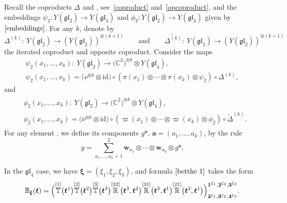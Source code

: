 \documentclass[pdftex]{sigma}
\numberwithin{equation}{section}
\begin{document}
Recall the coproducts $\Delta$ and \smash{$\widetilde{\Delta}$}, see~\eqref{coproduct} and~\eqref{opcoproduct}, and the embeddings $\psi_2\colon Y(\mathfrak{g l}_{2})\rightarrow Y(\mathfrak{g l}_{4})$ and $\phi_2\colon Y(\mathfrak{g l}_{2})\rightarrow Y(\mathfrak{g l}_{4})$ given by $\eqref{embeddings}$.
For any $k$, denote by
\[
 \Delta^{(k)}\colon \ Y(\mathfrak{g l}_{2}) \rightarrow(Y(\mathfrak{g l}_{2}))^{\otimes(k+1)} \qquad \text{and}\qquad \widetilde{\Delta^{(k)}}\colon \ Y(\mathfrak{g l}_{2}) \rightarrow(Y(\mathfrak{g l}_{2}))^{\otimes(k+1)}
 \]
 the iterated coproduct and opposite coproduct.
Consider the maps
\begin{gather*}\psi_2(x_{1}, \dots, x_{k})\colon\ Y(\mathfrak{g l}_{2}) \rightarrow\bigl(\mathbb{C}^{2}\bigr)^{\otimes k} \otimes Y(\mathfrak{g l}_{4}),
\\
\psi_2(x_{1}, \dots, x_{k})= \bigl(\nu^{\otimes k} \otimes \mathrm{id}\bigr) \circ (\pi (x_{1} ) \otimes \cdots \otimes \pi (x_{k} ) \otimes \psi_2 ) \circ\Delta^{(k)},
\end{gather*}
and
\begin{gather*}
\begin{split}
& \phi_2 (x_{1}, \dots, x_{k} )\colon\ Y(\mathfrak{g l}_{2}) \rightarrow\bigl(\mathbb{C}^{2}\bigr)^{\otimes k} \otimes Y(\mathfrak{g l}_{4}),
\\
& \phi_2 (x_{1}, \dots, x_{k} )= \bigl(\bar{\nu}^{\otimes k} \otimes \mathrm{id} \bigr) \circ ( \varpi (x_{1} ) \otimes \cdots \otimes \varpi (x_{k} ) \otimes \phi_2 ) \circ \widetilde{\Delta} ^{(k)}.
\end{split}
\end{gather*}
For any element , we define its components $g^{\boldsymbol{a}}$, $\boldsymbol{a}=(a_{1}, \dots, a_{k})$, by the rule
\begin{equation*}
g=\sum_{a_{1}, \dots, a_{k}=1}^{2} \mathbf{w}_{a_{1}} \otimes \cdots \otimes \mathbf{w}_{a_{k}} \otimes g^{\boldsymbol{a}}.
\end{equation*}

In the $\mathfrak{gl}_4$ case, we have $\boldsymbol{\xi}=(\xi_1,\xi_2,\xi_3)$, and formula $\eqref{betthe 1}$ takes the form
\begin{eqnarray*}
{\mathbb{B}}_{\boldsymbol{\xi}}(\boldsymbol{t})=\Bigl(\overset{[1]}{\mathbb{T}}\bigl(\boldsymbol{t}^1\bigr)\overset{[2]}{\mathbb{T}}\bigl(\boldsymbol{t}^2\bigr)\overset{[3]}{\mathbb{T}}\bigl(\boldsymbol{t}^3\bigr)
\overset{[32]}{\mathbb{R}}\bigl(\boldsymbol{t}^3,\boldsymbol{t}^2\bigr)\overset{[31]}{\mathbb{R}}\bigl(\boldsymbol{t}^3,\boldsymbol{t}^1\bigr)\overset{[21]}{\mathbb{R}}\bigl(\boldsymbol{t}^2,\boldsymbol{t}^1\bigr)
\Bigr)^{\boldsymbol{1}^{\xi_1}, \boldsymbol{2}^{\xi_2}, \boldsymbol{3}^{\xi_3}}_{\boldsymbol{2}^{\xi_1}, \boldsymbol{3}^{\xi_2}, \boldsymbol{4}^{\xi_3}}.
\end{eqnarray*}
\end{document}
